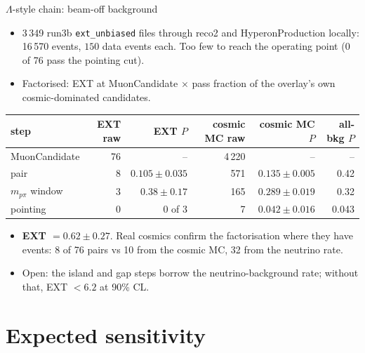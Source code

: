 \documentclass[aspectratio=169,10pt]{beamer}
\newcommand{\Lam}{\ensuremath{\Lambda}}
\begin{document}
\begin{frame}{\Lam-style chain: beam-off background}
  \small
  \begin{itemize}
    \item 3\,349 run3b \texttt{ext\_unbiased} files through reco2 and HyperonProduction
          locally: 16\,570 events, $150$ data events each. Too few to reach the
          operating point (0 of 76 pass the pointing cut).
    \item Factorised: EXT at MuonCandidate $\times$ pass fraction of the overlay's own
          cosmic-dominated candidates.
  \end{itemize}
  \footnotesize
  \begin{center}
  \begin{tabular}{lrrrrr}
    \toprule
    step & EXT raw & EXT $P$ & cosmic MC raw & cosmic MC $P$ & all-bkg $P$ \\
    \midrule
    MuonCandidate & 76 & -- & 4\,220 & -- & -- \\
    pair & 8 & $0.105\pm0.035$ & 571 & $0.135\pm0.005$ & 0.42 \\
    $m_{p\pi}$ window & 3 & $0.38\pm0.17$ & 165 & $0.289\pm0.019$ & 0.32 \\
    pointing & 0 & 0 of 3 & 7 & $0.042\pm0.016$ & 0.043 \\
    \bottomrule
  \end{tabular}
  \end{center}
  \small
  \begin{itemize}
    \item \textbf{EXT $=0.62\pm0.27$}. Real cosmics confirm the factorisation where they
          have events: 8 of 76 pairs vs 10 from the cosmic MC, 32 from the neutrino rate.
    \item Open: the island and gap steps borrow the neutrino-background rate; without
          that, EXT $<6.2$ at 90\% CL.
  \end{itemize}
\end{frame}

\section{Expected sensitivity}
\end{document}

